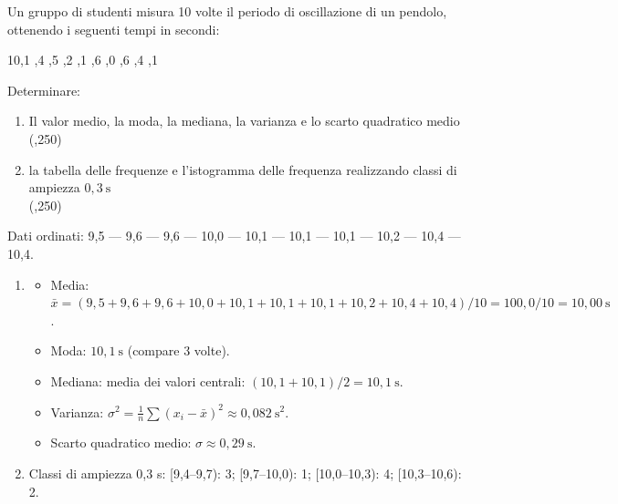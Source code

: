 \begin{question}[ID=2.1, subtitle={Indici statistici e istogramma del periodo di un pendolo}, tags={istogramma, indici statistici}, difficulty=media]
Un gruppo di studenti misura 10 volte il periodo di oscillazione di un pendolo, ottenendo i seguenti tempi in secondi:
\begin{center}
    10,1 ,4 ,5 ,2 ,1 ,6 ,0 ,6 ,4 ,1
\end{center}

\noindent
Determinare:
\begin{enumerate}
    \item Il valor medio, la moda, la mediana, la varianza e lo scarto quadratico medio \\
     \framebox(\linewidth,250){}
    \item la tabella delle frequenze e l'istogramma delle frequenza realizzando classi di ampiezza $0{,}3\ \text{s}$\\
     \framebox(\linewidth,250){}
\end{enumerate}
\begin{solution}
Dati ordinati: 9,5 — 9,6 — 9,6 — 10,0 — 10,1 — 10,1 — 10,1 — 10,2 — 10,4 — 10,4.
\begin{enumerate}
    \item
    \begin{itemize}
        \item Media: $\bar{x} = (9{,}5+9{,}6+9{,}6+10{,}0+10{,}1+10{,}1+10{,}1+10{,}2+10{,}4+10{,}4)/10 = 100{,}0/10 = 10{,}00\ \text{s}$.
        \item Moda: $10{,}1\ \text{s}$ (compare 3 volte).
        \item Mediana: media dei valori centrali: $(10{,}1+10{,}1)/2 = 10{,}1\ \text{s}$.
        \item Varianza: $\sigma^2 = \frac{1}{n}\sum(x_i-\bar{x})^2 \approx 0{,}082\ \text{s}^2$.
        \item Scarto quadratico medio: $\sigma \approx 0{,}29\ \text{s}$.
    \end{itemize}
    \item Classi di ampiezza 0,3 s: [9,4–9,7): 3; [9,7–10,0): 1; [10,0–10,3): 4; [10,3–10,6): 2.
\end{enumerate}
\end{solution}
\end{question}
